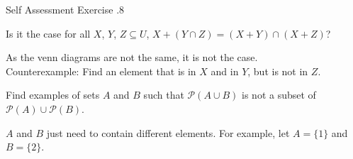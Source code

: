 \documentclass[\main/notes.tex]{subfiles}
\begin{document}
		\begin{exercise}{Self Assessment Exercise \thechapter.8}
			\begin{questions}
				\item Is it the case for all $X$, $Y$, $Z \subseteq U$, $X + (Y \cap Z) = (X + Y) \cap (X + Z)$?
					\begin{answer}
						\begin{center}
							\begin{vennthree}[labelA=$X$, labelB=$Y$, labelC=$Z$, tikzoptions={scale=0.8}][$X$]
								\fillA
							\end{vennthree}
							\begin{vennthree}[labelA=$X$, labelB=$Y$, labelC=$Z$, tikzoptions={scale=0.8}][$Y \cap Z$]
								\fillBCapC
							\end{vennthree}
							\begin{vennthree}[labelA=$X$, labelB=$Y$, labelC=$Z$, tikzoptions={scale=0.8}][$X + (Y \cap Z)$]
								\fillOnlyA
								\fillACapBNotC
								\fillACapCNotB
								\fillBCapCNotA
							\end{vennthree}
							\begin{vennthree}[labelA=$X$, labelB=$Y$, labelC=$Z$, tikzoptions={scale=0.8}][$X + Y$]
								\fillANotB
								\fillBNotA
							\end{vennthree}
							\begin{vennthree}[labelA=$X$, labelB=$Y$, labelC=$Z$, tikzoptions={scale=0.8}][$X + Z$]
								\fillANotC
								\fillCNotA
							\end{vennthree}
							\begin{vennthree}[labelA=$X$, labelB=$Y$, labelC=$Z$, tikzoptions={scale=0.8}][$X + (Y \cap Z)$]
								\fillOnlyA
								\fillBCapCNotA
							\end{vennthree}
						\end{center}
						As the venn diagrams are not the same, it is not the case.\\
						Counterexample: Find an element that is in $X$ and in $Y$, but is not in $Z$.
					\end{answer}
				\item Find examples of sets $A$ and $B$ such that $\mathcal{P}(A \cup B)$ is not a subset of $\mathcal{P}(A) \cup \mathcal{P}(B)$.\\
					\begin{answer}
						$A$ and $B$ just need to contain different elements. For example, let $A = \{1\}$ and $B = \{2\}$.
						\begin{align*}

\end{align*}
\end{answer}
\end{questions}
\end{exercise}
\end{document}
